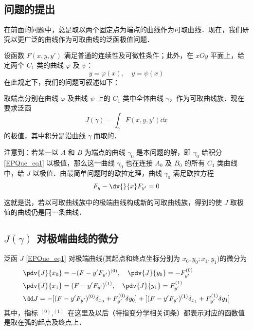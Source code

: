 
\begin{issues}
\issueTODO
\end{issues}

\subsection{问题的提出}在前面的问题中，总是取以两个固定点为端点的曲线作为可取曲线．现在，我们研究以更广泛的曲线作为可取曲线的泛函极值问题．

设函数 $F(x,y,y')$ 满足普通的连续性及可微性条件；此外，在 $xOy$ 平面上，给定两个 $C_1$ 类的曲线 $\varphi$ 及 $\psi$：
\begin{equation}
y=\varphi(x),\quad y=\psi(x)
\end{equation}
在此规定下，我们的问题可叙述如下：

取端点分别在曲线 $\varphi$ 及曲线 $\psi$ 上的 $C_1$ 类中全体曲线 $\gamma$，作为可取曲线族．现在要求泛函
\begin{equation}\label{EPQue_eq1}
J(\gamma)=\int_\gamma F(x,y,y')\dd x
\end{equation}
的极值，其中积分是沿曲线 $\gamma$ 而取的．

注意到：若某一以 $A$ 和 $B$ 为端点的曲线 $\gamma_0$ 是本问题的解，即 $\gamma_0$ 给积分\autoref{EPQue_eq1} 以极值，那么这一曲线 $\gamma_0$ 也在连接 $A_0$ 及 $B_0$ 的所有 $C_1$ 类曲线中，给 $J$ 以极值．由最简单问题时的欧拉定理，曲线 $\gamma_0$ 满足欧拉方程
\begin{equation}
F_y-\dv{}{x}F_{y'}=0
\end{equation}

这就是说，若以可取曲线族中的极端曲线构成新的可取曲线族，得到的使 $J$ 取极值的曲线仍是同一条曲线．
\subsection{$J(\gamma)$ 对极端曲线的微分} 
\begin{theorem}{}
泛函 $J$ \autoref{EPQue_eq1} 对极端曲线(其起点和终点坐标分别为 $x_0,y_0;x_1,y_1$)的微分为
\begin{equation}
\begin{aligned}
&\pdv{J}{x_0}=-(F-y'F_{y'})^{(0)},\quad \pdv{J}{y_0}=-F_{y'}^{(0)}\\
&\pdv{J}{x_1}=(F-y'F_{y'})^{(1)},\quad \pdv{J}{y_1}=F_{y'}^{(1)}\\
&\dd J=-[(F-y'F_{y'})^{(0)}\delta_{x_0}+ F_{y'}^{(0)}\delta y_0]+[(F-y'F_{y'})^{(1)}\delta_{x_1}+F_{y'}^{(1)}\delta y_1]
\end{aligned}
\end{equation}
其中，指标 $^{(0)},^{(1)}$ 在这里及以后（特指变分学相关词条）都表示对应的函数值是取在弧的起点及终点上．
\end{theorem}
